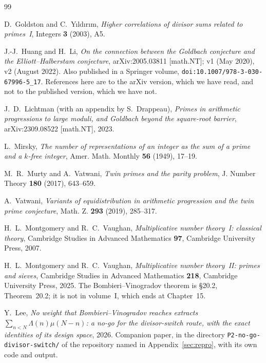 \documentclass[11pt,a4paper]{article}
\theoremstyle{plain}
\theoremstyle{definition}
\theoremstyle{remark}
\begin{document}
\begin{thebibliography}{99}

 D.~Goldston and C.~Y{\i}ld{\i}r{\i}m,
\emph{Higher correlations of divisor sums related to primes~I},
Integers \textbf{3} (2003), A5.

 J.-J.~Huang and H.~Li, \emph{On the connection between
the Goldbach conjecture and the Elliott--Halberstam conjecture},
arXiv:2005.03811 [math.NT]; v1 (May 2020), v2 (August 2022). Also
published in a Springer volume,
\texttt{doi:10.1007/978-3-030-67996-5\_17}. References here are to the
arXiv version, which we have read, and not to the published version,
which we have not.

 J.~D.~Lichtman (with an appendix by S.~Drappeau),
\emph{Primes in arithmetic progressions to large moduli, and Goldbach
beyond the square-root barrier}, arXiv:2309.08522 [math.NT], 2023.

 L.~Mirsky, \emph{The number of representations of an
integer as the sum of a prime and a $k$-free integer},
Amer. Math. Monthly \textbf{56} (1949), 17--19.

 M.~R.~Murty and A.~Vatwani, \emph{Twin primes and
the parity problem}, J. Number Theory \textbf{180} (2017), 643--659.

 A.~Vatwani, \emph{Variants of equidistribution in
arithmetic progression and the twin prime conjecture}, Math. Z.
\textbf{293} (2019), 285--317.

 H.~L.~Montgomery and R.~C.~Vaughan,
\emph{Multiplicative number theory~I: classical theory}, Cambridge
Studies in Advanced Mathematics \textbf{97}, Cambridge University
Press, 2007.

 H.~L.~Montgomery and R.~C.~Vaughan,
\emph{Multiplicative number theory~II: primes and sieves}, Cambridge
Studies in Advanced Mathematics \textbf{218}, Cambridge University
Press, 2025. The Bombieri--Vinogradov theorem is \S20.2,
Theorem~20.2; it is not in volume~I, which ends at Chapter~15.

 Y.~Lee, \emph{No weight that Bombieri--Vinogradov reaches
extracts $\sum_{n<N}\Lambda(n)\mu(N-n)$: a no-go for the
divisor-switch route, with the exact identities of its design space},
2026. Companion paper, in the directory
\texttt{P2-no-go-divisor-switch/} of the repository named in
Appendix~\ref{sec:repro}, with its own code and output.


\end{thebibliography}
\end{document}
